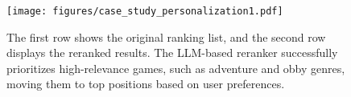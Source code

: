 \begin{figure}[t]
\begin{center}
\centerline{\texttt{[image: figures/case\_study\_personalization1.pdf]}}

\caption{The first row shows the original ranking list, and the second row displays the reranked results. The LLM-based reranker successfully prioritizes high-relevance games, such as adventure and obby genres, moving them to top positions based on user preferences.}
\label{fig:case_study_ranking_list}
\end{center}
\vskip -0.3in
\end{figure}
